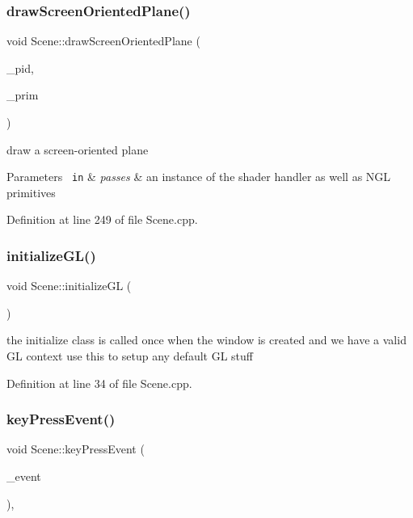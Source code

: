 \subsubsection{drawScreenOrientedPlane()}
{\footnotesize\ttfamily void Scene\+::draw\+Screen\+Oriented\+Plane (\begin{DoxyParamCaption}\item[{G\+Luint}]{\+\_\+pid,  }\item[{ngl\+::\+V\+A\+O\+Primitives $\ast$}]{\+\_\+prim }\end{DoxyParamCaption})\hspace{0.3cm}{\ttfamily [private]}}



draw a screen-\/oriented plane 


\begin{DoxyParams}[1]{Parameters}
\mbox{\texttt{ in}}  & {\em passes} & an instance of the shader handler as well as N\+GL primitives \\
\hline
\end{DoxyParams}


Definition at line 249 of file Scene.\+cpp.

\mbox{\label{class_scene_a0342c4d5793669ee7498a75c13026880}} 
\subsubsection{initializeGL()}
{\footnotesize\ttfamily void Scene\+::initialize\+GL (\begin{DoxyParamCaption}{ }\end{DoxyParamCaption})\hspace{0.3cm}{\ttfamily [override]}}



the initialize class is called once when the window is created and we have a valid GL context use this to setup any default GL stuff 



Definition at line 34 of file Scene.\+cpp.

\mbox{\label{class_scene_a5d59a1d3162e89478fd3f4d54efdee01}} 
\subsubsection{keyPressEvent()}
{\footnotesize\ttfamily void Scene\+::key\+Press\+Event (\begin{DoxyParamCaption}\item[{Q\+Key\+Event $\ast$}]{\+\_\+event }\end{DoxyParamCaption})\hspace{0.3cm}{\ttfamily [override]}, {\ttfamily [private]}}



